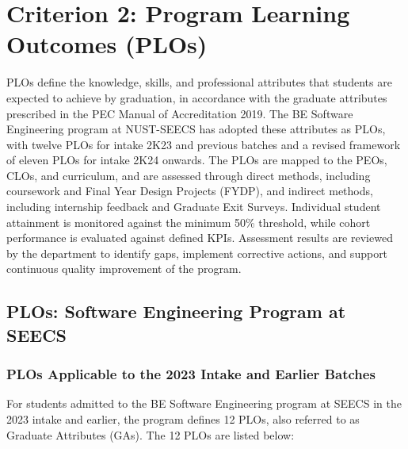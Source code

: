 \hypertarget{criterion2}{%
\chapter{Criterion 2: Program Learning Outcomes (PLOs)}\label{criterion2}}

\let\CriterionTwoOriginalIncludeGraphics\includegraphics
\renewcommand{\includegraphics}[2][]{%
  \CriterionTwoOriginalIncludeGraphics[height=0.72\textheight,keepaspectratio,#1]{#2}%
}

PLOs define the knowledge, skills, and professional attributes that students are expected to achieve by graduation, in accordance with the graduate attributes prescribed in the PEC Manual of Accreditation 2019. The BE Software Engineering program at NUST-SEECS has adopted these attributes as PLOs, with twelve PLOs for intake 2K23 and previous batches and a revised framework of eleven PLOs for intake 2K24 onwards. The PLOs are mapped to the PEOs, CLOs, and curriculum, and are assessed through direct methods, including coursework and Final Year Design Projects (FYDP), and indirect methods, including internship feedback and Graduate Exit Surveys. Individual student attainment is monitored against the minimum 50\% threshold, while cohort performance is evaluated against defined KPIs. Assessment results are reviewed by the department to identify gaps, implement corrective actions, and support continuous quality improvement of the program.

\hypertarget{sec:3.1plos}{%
\section{PLOs: Software Engineering Program at SEECS}\label{sec:3.1plos}}

\hypertarget{sec:plosseecs}{%
\subsection{PLOs Applicable to the 2023 Intake and Earlier Batches}\label{sec:plosseecs}}

For students admitted to the BE Software Engineering program at SEECS in the 2023 intake and earlier, the program defines 12 PLOs, also referred to as Graduate Attributes (GAs). The 12 PLOs are listed below:

